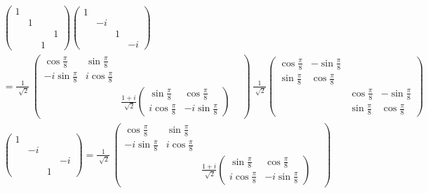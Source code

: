 \documentclass[11pt]{article}
\numberwithin{equation}{section} %
\numberwithin{figure}{section} %
\begin{document}
\begin{appendices}
\begin{equation}
\begin{split}
&	\begin{pmatrix} 1&&&\\ &1&&\\ &&&1\\ &&1&\end{pmatrix} \begin{pmatrix} 1&&&\\ &-i&&\\ &&1&\\ &&&-i \end{pmatrix} \\
&   = \frac{1}{\sqrt[]{2}}\, \begin{pmatrix} \cos\frac{\pi}{8}&\sin\frac{\pi}{8}&&\\-i\sin\frac{\pi}{8}&i\cos\frac{\pi}{8}&&\\ &&\frac{1+i}{\sqrt[]{2}} \begin{pmatrix} \sin\frac{\pi}{8}&\cos\frac{\pi}{8}\\i\cos\frac{\pi}{8}&-i\sin\frac{\pi}{8} \end{pmatrix} \end{pmatrix}\, \frac{1}{\sqrt[]{2}}\begin{pmatrix} \cos\frac{\pi}{8}&-\sin\frac{\pi}{8}&&\\ \sin\frac{\pi}{8}&\cos\frac{\pi}{8}&&\\ &&\cos\frac{\pi}{8}&-\sin\frac{\pi}{8}\\ &&\sin\frac{\pi}{8}&\cos\frac{\pi}{8} \end{pmatrix}\\
&   \begin{pmatrix} 1&&&\\ &-i&&\\ &&&-i\\ &&1&\end{pmatrix} = \frac{1}{\sqrt[]{2}}\, \begin{pmatrix} \cos\frac{\pi}{8}&\sin\frac{\pi}{8}&&\\-i\sin\frac{\pi}{8}&i\cos\frac{\pi}{8}&&\\ &&\frac{1+i}{\sqrt[]{2}} \begin{pmatrix} \sin\frac{\pi}{8}&\cos\frac{\pi}{8}\\i\cos\frac{\pi}{8}&-i\sin\frac{\pi}{8} \end{pmatrix} \end{pmatrix}\\

\end{split}
\end{equation}
\end{appendices}
\end{document}
